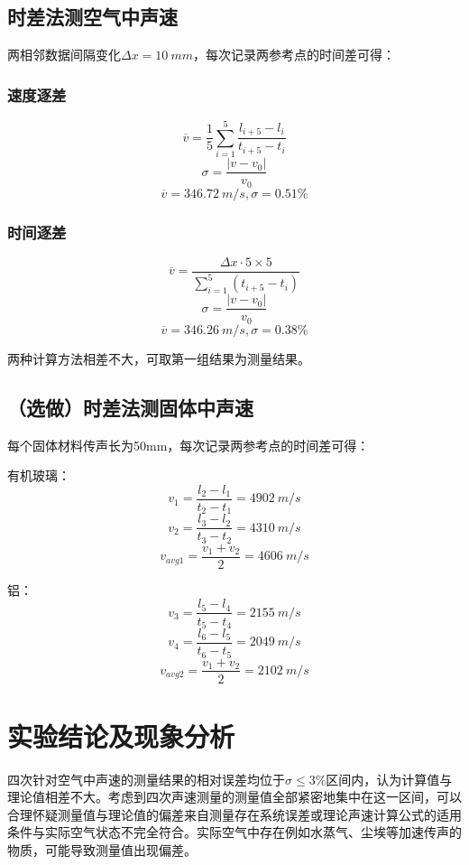 \documentclass{ctexart}
\begin{document}
\subsection{时差法测空气中声速}

两相邻数据间隔变化$\Delta x = 10\ mm$，每次记录两参考点的时间差可得：

\subsubsection{速度逐差}

$$ \overline{v} = \frac{1}{5} \sum\limits_{i = 1}^{5} \frac{l_{i+5}-l_i}{t_{i+5}-t_i} $$
$$ \sigma = \frac{|v - v_0|}{v_0} $$
$$ \overline{v} = 346.72 \ m/s, \sigma = 0.51\% $$

\subsubsection{时间逐差}

$$ \overline{v} = \frac{\Delta x \cdot 5 \times 5}{\sum\limits_{i=1}^{5}(t_{i+5}-t_i)} $$
$$ \sigma = \frac{|v - v_0|}{v_0} $$
$$ \overline{v} = 346.26 \ m/s, \sigma = 0.38\% $$

两种计算方法相差不大，可取第一组结果为测量结果。

\subsection{（选做）时差法测固体中声速}

每个固体材料传声长为50mm，每次记录两参考点的时间差可得： 

有机玻璃：
$$ v_1 = \frac{l_2-l_1}{t_2-t_1} = 4902 \ m/s $$
$$ v_2 = \frac{l_3-l_2}{t_3-t_2} = 4310 \ m/s $$
$$ v_{avg1} = \frac{v_1+v_2}{2} = 4606 \ m/s $$

铝：
$$ v_3 = \frac{l_5-l_4}{t_5-t_4} = 2155 \ m/s $$
$$ v_4 = \frac{l_6-l_5}{t_6-t_5} = 2049 \ m/s $$
$$ v_{avg2} = \frac{v_1+v_2}{2} = 2102 \ m/s $$

\section{实验结论及现象分析}

四次针对空气中声速的测量结果的相对误差均位于$\sigma \leq 3\%$区间内，认为计算值与理论值相差不大。考虑到四次声速测量的测量值全部紧密地集中在这一区间，可以合理怀疑测量值与理论值的偏差来自测量存在系统误差或理论声速计算公式的适用条件与实际空气状态不完全符合。实际空气中存在例如水蒸气、尘埃等加速传声的物质，可能导致测量值出现偏差。 
\end{document}
